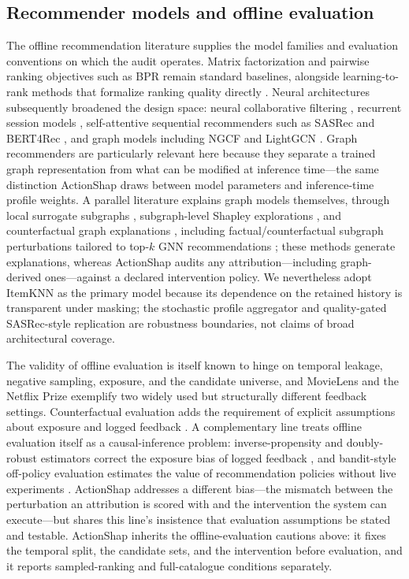 \documentclass[manuscript,screen,review,anonymous]{acmart}
\begin{document}
\subsection{Recommender models and offline evaluation}
The offline recommendation literature supplies the model families and evaluation conventions on which the audit operates. Matrix factorization \citep{koren2009} and pairwise ranking objectives such as BPR \citep{rendle2009} remain standard baselines, alongside learning-to-rank methods that formalize ranking quality directly \citep{joachims2002,burges2005}. Neural architectures subsequently broadened the design space: neural collaborative filtering \citep{he2017ncf}, recurrent session models \citep{hidasi2016gru4rec}, self-attentive sequential recommenders such as SASRec \citep{kang2018sasrec} and BERT4Rec \citep{sun2019bert4rec}, and graph models including NGCF \citep{wang2019ngcf} and LightGCN \citep{he2020lightgcn}. Graph recommenders are particularly relevant here because they separate a trained graph representation from what can be modified at inference time---the same distinction ActionShap draws between model parameters and inference-time profile weights. A parallel literature explains graph models themselves, through local surrogate subgraphs \citep{ying2019gnnexplainer,luo2020pgexplainer}, subgraph-level Shapley explorations \citep{yuan2021subgraphx,duval2021graphsvx}, and counterfactual graph explanations \citep{lucic2022cfgnnexplainer}, including factual/counterfactual subgraph perturbations tailored to top-$k$ GNN recommendations \citep{chen2025grease}; these methods generate explanations, whereas ActionShap audits any attribution---including graph-derived ones---against a declared intervention policy. We nevertheless adopt ItemKNN as the primary model because its dependence on the retained history is transparent under masking; the stochastic profile aggregator and quality-gated SASRec-style replication are robustness boundaries, not claims of broad architectural coverage.

The validity of offline evaluation is itself known to hinge on temporal leakage, negative sampling, exposure, and the candidate universe, and MovieLens \citep{harper2016} and the Netflix Prize \citep{bennett2007} exemplify two widely used but structurally different feedback settings. Counterfactual evaluation adds the requirement of explicit assumptions about exposure and logged feedback \citep{saito2021}. A complementary line treats offline evaluation itself as a causal-inference problem: inverse-propensity and doubly-robust estimators correct the exposure bias of logged feedback \citep{schnabel2016debias,joachims2017unbiased,saito2020ips}, and bandit-style off-policy evaluation estimates the value of recommendation policies without live experiments \citep{li2011linucb}. ActionShap addresses a different bias---the mismatch between the perturbation an attribution is scored with and the intervention the system can execute---but shares this line's insistence that evaluation assumptions be stated and testable. ActionShap inherits the offline-evaluation cautions above: it fixes the temporal split, the candidate sets, and the intervention before evaluation, and it reports sampled-ranking and full-catalogue conditions separately.
\end{document}
